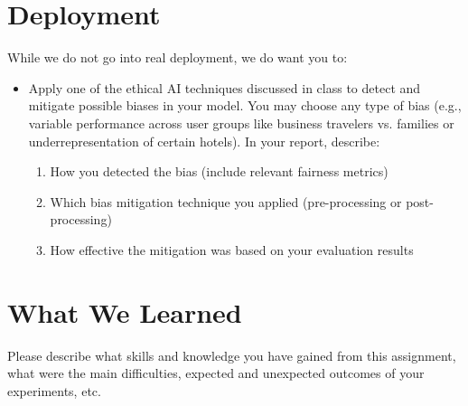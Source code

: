 \documentclass[runningheads]{llncs}
\begin{document}
\section{Deployment}

\color{blue}While we do not go into real deployment, we do want you to:
\begin{itemize}
    \item Apply one of the ethical AI techniques discussed in class to detect and mitigate possible
biases in your model. You may choose any type of bias (e.g., variable performance
across user groups like business travelers vs. families or underrepresentation of certain
hotels). In your report, describe:
\begin{enumerate}
    \item How you detected the bias (include relevant fairness metrics)
    \item Which bias mitigation technique you applied (pre-processing or post-processing)
    \item How effective the mitigation was based on your evaluation results\color{black}
\end{enumerate}
\end{itemize}
\color{black}

\section{What We Learned}

\color{blue}Please describe what skills and knowledge you have gained from this assignment, what were the main difficulties, expected and unexpected outcomes of your
experiments, etc.\color{black}


%
%
%


% 
\end{document}
